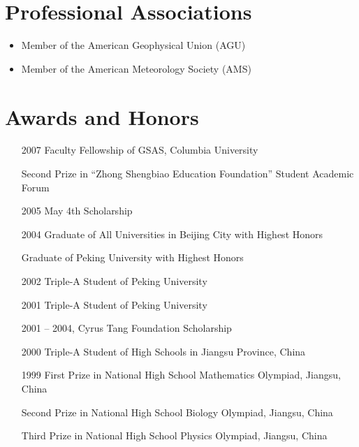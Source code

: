 \documentclass[11pt]{article}
\begin{document}
\section{Professional Associations}
\begin{itemize}[leftmargin=4ex]
	\item Member of the American Geophysical Union (AGU)
	\item Member of the American Meteorology Society (AMS)
\end{itemize}


\section{Awards and Honors}
\begin{itemize}[leftmargin=10ex, itemsep=0ex]
	\item[2007] Faculty Fellowship of GSAS, Columbia University

	\item[\phantom{2007}] Second Prize in ``Zhong Shengbiao Education Foundation'' Student  Academic Forum

	\item[2005] May 4th Scholarship

	\item[2004] Graduate of All Universities in Beijing City with Highest Honors

	\item[\phantom{2004}] Graduate of Peking University with Highest Honors

	\item[2002] Triple-A Student of Peking University
	
	\item[2001] Triple-A Student of Peking University

	\item[2001]-- 2004, Cyrus Tang Foundation Scholarship

	\item[2000] Triple-A Student of High Schools in Jiangsu Province,  China

	\item[1999] First Prize in National High School Mathematics Olympiad, Jiangsu, China

	\item[\phantom{1999}] Second Prize in National High School Biology Olympiad, Jiangsu, China

	\item[\phantom{1999}] Third Prize in National High School Physics Olympiad, Jiangsu, China
\end{itemize}
\end{document}
